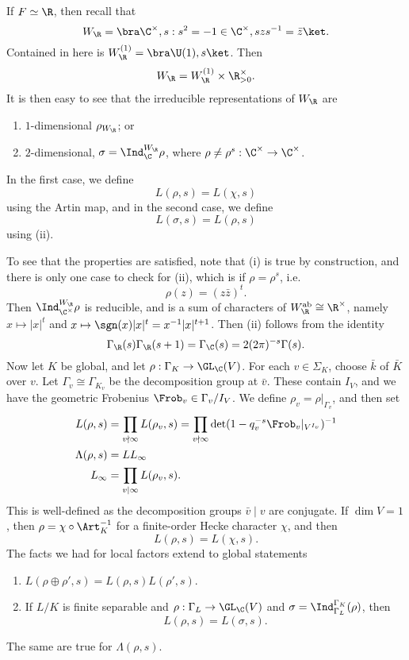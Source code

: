\documentclass[a4paper]{article}
\newcommand\ab{\mathrm{ab}}
\begin{document}
If $F \simeq \R$, then recall that
\[
  W_\R = \bra \C^\times, s : s^2 = -1 \in \C^\times, szs^{-1} = \bar{z}\ket.
\]
Contained in here is $W_\R^{(1)} = \bra \U(1), s\ket$. Then
\[
  W_\R = W_\R^{(1)} \times \R_{>0}^\times.
\]
It is then easy to see that the irreducible representations of $W_\R$ are
\begin{enumerate}
  \item $1$-dimensional $\rho_{W_\R}$; or 
  \item $2$-dimensional, $\sigma = \Ind_\C^{W_\R} \rho$, where $\rho \not= \rho^s: \C^\times \to \C^\times$.
\end{enumerate}
In the first case, we define
\[
  L(\rho, s) = L(\chi, s)
\]
using the Artin map, and in the second case, we define
\[
  L(\sigma, s) = L(\rho, s)
\]
using (ii).

To see that the properties are satisfied, note that (i) is true by construction, and there is only one case to check for (ii), which is if $\rho = \rho^s$, i.e.
\[
  \rho(z) = (z\bar{z})^t.
\]
Then $\Ind_{\C^\times}^{W_\R} \rho$ is reducible, and is a sum of characters of $W_\R^{\ab} \cong \R^\times$, namely $x \mapsto |x|^t$ and $x \mapsto \sgn(x) |x|^t = x^{-1}|x|^{t + 1}$. Then (ii) follows from the identity
\[
  \Gamma_\R(s) \Gamma_\R(s + 1) = \Gamma_\C(s) = 2 (2\pi)^{-s} \Gamma(s).
\]
Now let $K$ be global, and let $\rho: \Gamma_K \to \GL_\C(V)$. For each $v \in \Sigma_K$, choose $\bar{k}$ of $\bar{K}$ over $v$. Let $\Gamma_v \cong \Gamma_{K_v}$ be the decomposition group at $\bar{v}$.  These contain $I_V$, and we have the geometric Frobenius $\Frob_v \in \Gamma_v/I_V$. We define $\rho_v = \rho|_{\Gamma_v}$, and then set
\begin{align*}
  L(\rho, s) &= \prod_{v \nmid \infty} L(\rho_v, s) =\prod_{v \nmid \infty} \det (1 - q_v^{-s} \Frob_v|_{V^{I_v}})^{-1}\\
  \Lambda(\rho, s) &= L L_\infty\\
  L_\infty &= \prod_{v \mid \infty} L(\rho_v, s).
\end{align*}
This is well-defined as the decomposition groups $\bar{v} \mid v $ are conjugate. If $\dim V = 1$, then $\rho = \chi \circ \Art_K^{-1}$ for a finite-order Hecke character $\chi$, and then
\[
  L(\rho, s) = L(\chi, s).
\]
The facts we had for local factors extend to global statements
\begin{prop}\leavevmode
  \begin{enumerate}
    \item $L(\rho \oplus \rho', s) = L(\rho, s) L(\rho', s)$.
    \item If $L/K$ is finite separable and $\rho: \Gamma_L \to \GL_\C(V)$ and $\sigma = \Ind_{\Gamma_L}^{\Gamma_K}(\rho)$, then
      \[
        L(\rho, s) = L(\sigma, s).
      \]
  \end{enumerate}
  The same are true for $\Lambda(\rho, s)$.
\end{prop}
\end{document}
